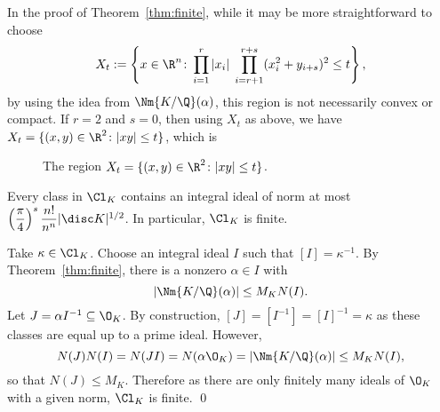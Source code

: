 \begin{rem}
In the proof of Theorem~\ref{thm:finite}, while it may be more straightforward to choose
	\[
	X_t:= \left\{ x \in \R^n \colon \prod_{i=1}^r |x_i| \; \prod_{i=r+1}^{r+s} (x_i^2+y_{i+s})^2 \leq t \right\},
	\]
by using the idea from $\Nm{K/\Q}(\alpha)$, this region is not necessarily convex or compact. If $r=2$ and $s=0$, then using $X_t$ as above, we have $X_t=\{(x,y) \in \R^2 \colon |xy| \leq t\}$, which is
	\begin{figure}[h!]
	\centering

	\caption{The region $X_t=\{(x,y) \in \R^2 \colon |xy| \leq t\}$. \label{fig:fundex}}
	\end{figure}
\end{rem}


\begin{cor}\label{cor:finite}
Every class in $\Cl_K$ contains an integral ideal of norm at most $ \left(\dfrac{\pi}{4}\right)^s \dfrac{n!}{n^n} |\disc K|^{1/2}$. In particular, $\Cl_K$ is finite. 
\end{cor}

\pf Take $\kappa \in \Cl_K$. Choose an integral ideal $I$ such that $[I]= \kappa^{-1}$. By Theorem~\ref{thm:finite}, there is a nonzero $\alpha \in I$ with
	\[
	|\Nm{K/\Q}(\alpha)| \leq M_K N(I).
	\]
Let $J=\alpha I^{-1} \subseteq \O_K$. By construction, $[J]=[I^{-1}]=[I]^{-1}=\kappa$ as these classes are equal up to a prime ideal. However,
	\[
	N(J)N(I)= N(JI)= N(\alpha \O_K)= |\Nm{K/\Q}(\alpha)| \leq M_K N(I),
	\]
so that $N(J) \leq M_K$. Therefore as there are only finitely many ideals of $\O_K$ with a given norm, $\Cl_K$ is finite. \qed \\

